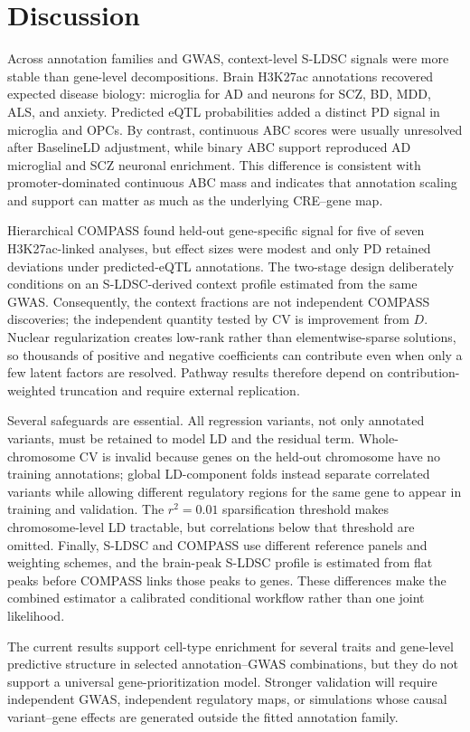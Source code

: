 \documentclass[11pt]{article}
\begin{document}
\section{Discussion}

Across annotation families and GWAS, context-level S-LDSC signals were more stable than gene-level decompositions. Brain H3K27ac annotations recovered expected disease biology: microglia for AD and neurons for SCZ, BD, MDD, ALS, and anxiety. Predicted eQTL probabilities added a distinct PD signal in microglia and OPCs. By contrast, continuous ABC scores were usually unresolved after BaselineLD adjustment, while binary ABC support reproduced AD microglial and SCZ neuronal enrichment. This difference is consistent with promoter-dominated continuous ABC mass and indicates that annotation scaling and support can matter as much as the underlying CRE--gene map.

Hierarchical COMPASS found held-out gene-specific signal for five of seven H3K27ac-linked analyses, but effect sizes were modest and only PD retained deviations under predicted-eQTL annotations. The two-stage design deliberately conditions on an S-LDSC-derived context profile estimated from the same GWAS. Consequently, the context fractions are not independent COMPASS discoveries; the independent quantity tested by CV is improvement from $D$. Nuclear regularization creates low-rank rather than elementwise-sparse solutions, so thousands of positive and negative coefficients can contribute even when only a few latent factors are resolved. Pathway results therefore depend on contribution-weighted truncation and require external replication.

Several safeguards are essential. All regression variants, not only annotated variants, must be retained to model LD and the residual term. Whole-chromosome CV is invalid because genes on the held-out chromosome have no training annotations; global LD-component folds instead separate correlated variants while allowing different regulatory regions for the same gene to appear in training and validation. The $r^2=0.01$ sparsification threshold makes chromosome-level LD tractable, but correlations below that threshold are omitted. Finally, S-LDSC and COMPASS use different reference panels and weighting schemes, and the brain-peak S-LDSC profile is estimated from flat peaks before COMPASS links those peaks to genes. These differences make the combined estimator a calibrated conditional workflow rather than one joint likelihood.

The current results support cell-type enrichment for several traits and gene-level predictive structure in selected annotation--GWAS combinations, but they do not support a universal gene-prioritization model. Stronger validation will require independent GWAS, independent regulatory maps, or simulations whose causal variant--gene effects are generated outside the fitted annotation family.
\end{document}

